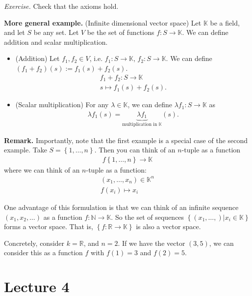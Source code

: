 \documentclass[12pt]{article}
\newcommand{\RR}{\mathbb{R}}
\newcommand{\NN}{\mathbb{N}}
\def\KK{\mathbb{K}}
\def\lb{\lambda}
\begin{document}
{\it Exercise.}  Check that the axioms hold.

{\bf More general example.} (Infinite dimensional vector space) Let $\KK$ be a field, and let $S$ be any set.  Let $V$ be the set of functions $f: S \to \KK$.  We can define addition and scalar multiplication.

\begin{itemize}
  \item (Addition) Let $f_1, f_2 \in V$, i.e. $f_1 : S \to \KK$, $f_2: S \to \KK$.  We can define  $(f_1 + f_2)(s) := f_1(s) + f_2(s)$.
    \begin{align*}
      f_1 + f_2 : S \to \KK \\
      s \mapsto f_1(s) + f_2(s).
    \end{align*}

  \item (Scalar multiplication) For any $\lb \in \KK$, we can define $\lb f_1 : S \to \KK$ as
    \begin{align*}
      \lb f_1(s) = \underbrace{\lb f_1}_{\text{multiplication in $\KK$}}(s).
    \end{align*}
\end{itemize}

{\bf Remark.} Importantly, note that the first example is a special case of the second example.  Take $S  = \left\{ 1, \dots, n \right\}$.  Then you can think of an $n$-tuple as a function
\begin{align*}
  f \left\{ 1, \dots, n \right\} \to \KK
\end{align*}
where we can think of an $n$-tuple as a function:
\begin{align*}
  (x_1, \dots, x_n) \in \KK^n \\
  f(x_i) \mapsto x_i
\end{align*}

One advantage of this formulation is that we can think of an infinite sequence $(x_1, x_2, \dots)$ as a function $f : \NN \to \KK$.  So the set of sequences $\left\{ (x_1, \dots, ) | x_i \in \KK \right\}$ forms a vector space.  That is, $\left\{ f: \RR \to \KK \right\}$ is also a vector space.

Concretely, consider $k = \RR$, and $n = 2$.  If we have the vector $(3, 5)$, we can consider this as a function $f$ with $f(1) = 3$ and $f(2) = 5$.


\section{Lecture 4}
\end{document}
